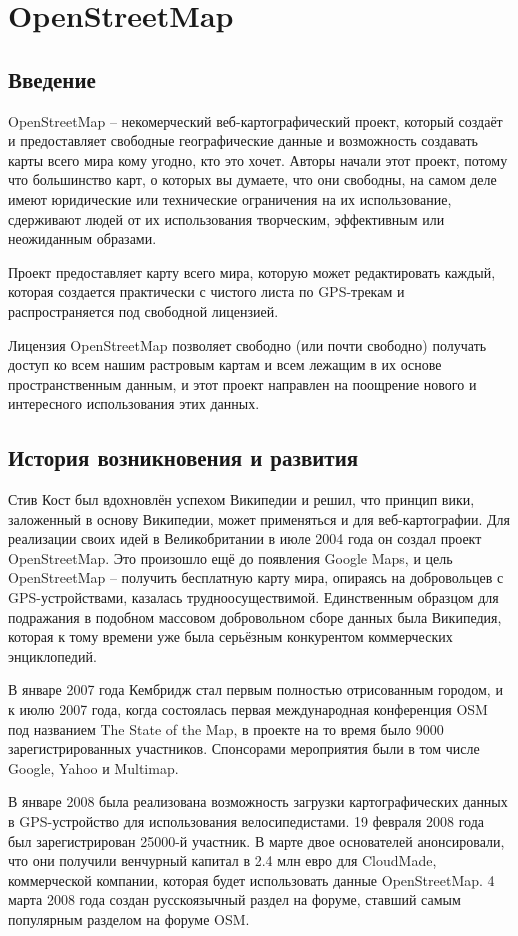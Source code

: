 \chapter{OpenStreetMap}
\section{Введение}
OpenStreetMap -- некомерческий веб-картографический проект, который создаёт и 
предоставляет свободные географические данные и возможность создавать карты 
всего мира кому угодно, кто это хочет. Авторы начали этот проект, потому что 
большинство карт, о которых вы думаете, что они свободны, на самом деле имеют 
юридические или технические ограничения на их использование, сдерживают людей 
от их использования творческим, эффективным или неожиданным образами. 

Проект предоставляет карту всего мира, которую может редактировать каждый, 
которая создается практически с чистого листа по GPS-трекам и распространяется 
под свободной лицензией.

Лицензия OpenStreetMap позволяет свободно (или почти свободно) получать доступ 
ко всем нашим растровым картам и всем лежащим в их основе пространственным 
данным, и этот проект направлен на поощрение нового и интересного 
использования этих данных.\cite{osmwiki}

\section{История возникновения и развития}
Стив Кост был вдохновлён успехом Википедии и решил, что принцип вики, 
заложенный в основу Википедии, может применяться и для веб-картографии. Для 
реализации своих идей в Великобритании в июле 2004 года он создал проект 
OpenStreetMap. Это произошло ещё до появления Google Maps, и цель 
OpenStreetMap -- получить бесплатную карту мира, опираясь на добровольцев с 
GPS-устройствами, казалась трудноосуществимой. Единственным образцом для 
подражания в подобном массовом добровольном сборе данных была Википедия, 
которая к тому времени уже была серьёзным конкурентом коммерческих 
энциклопедий.

В январе 2007 года Кембридж стал первым полностью отрисованным городом, и к 
июлю 2007 года, когда состоялась первая международная конференция OSM под 
названием The State of the Map, в проекте на то время было 9000 
зарегистрированных участников. Спонсорами мероприятия были в том числе Google, 
Yahoo и Multimap.

В январе 2008 была реализована возможность загрузки картографических данных в 
GPS-устройство для использования велосипедистами. 19 февраля 2008 года был 
зарегистрирован 25000-й участник. В марте двое основателей анонсировали, что 
они получили венчурный капитал в 2.4 млн евро для CloudMade, коммерческой 
компании, которая будет использовать данные OpenStreetMap. 4 марта 2008 года 
создан русскоязычный раздел на форуме, ставший самым популярным разделом на 
форуме OSM.

